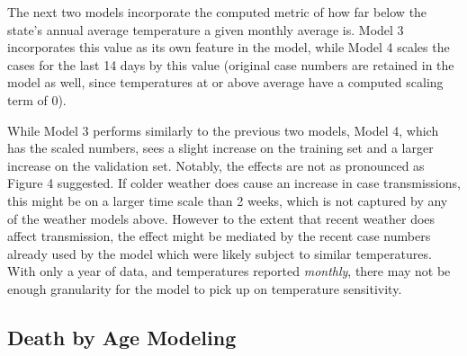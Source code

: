\documentclass[11pt]{article}
\begin{document}
The next two models incorporate the computed metric of how far below the state's annual average temperature a given monthly average is. Model 3 incorporates this value as its own feature in the model, while Model 4 scales the cases for the last 14 days by this value (original case numbers are retained in the model as well, since temperatures at or above average have a computed scaling term of 0). 

While Model 3 performs similarly to the previous two models, Model 4, which has the scaled numbers, sees a slight increase on the training set and a larger increase on the validation set. Notably, the effects are not as pronounced as Figure 4 suggested. If colder weather does cause an increase in case transmissions, this might be on a larger time scale than 2 weeks, which is not captured by any of the weather models above. However to the extent that recent weather does affect transmission, the effect might be mediated by the recent case numbers already used by the model which were likely subject to similar temperatures. With only a year of data, and temperatures reported \textit{monthly}, there may not be enough granularity for the model to pick up on temperature sensitivity. 





\subsection{Death by Age Modeling}
\end{document}
